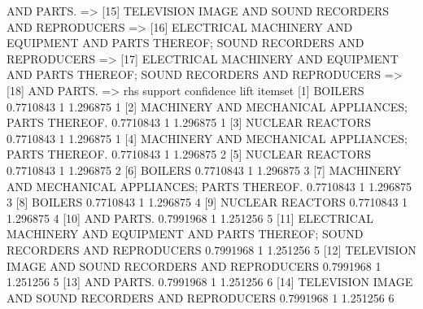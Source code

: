 \documentclass [a4paper] {article}
\begin{document}
{\begin{Schunk}
\begin{Soutput}
[14] {AND PARTS.}                                                                                                                                 =>
[15] {TELEVISION IMAGE AND SOUND RECORDERS AND REPRODUCERS}                                                                                       =>
[16] {ELECTRICAL MACHINERY AND EQUIPMENT AND PARTS THEREOF; SOUND RECORDERS AND REPRODUCERS}                                                      =>
[17] {ELECTRICAL MACHINERY AND EQUIPMENT AND PARTS THEREOF; SOUND RECORDERS AND REPRODUCERS}                                                      =>
[18] {AND PARTS.}                                                                                                                                 =>
     rhs                                                                                     support   confidence lift     itemset
[1]  {BOILERS}                                                                               0.7710843 1          1.296875 1      
[2]  {MACHINERY AND MECHANICAL APPLIANCES; PARTS THEREOF.}                                   0.7710843 1          1.296875 1      
[3]  {NUCLEAR REACTORS}                                                                      0.7710843 1          1.296875 1      
[4]  {MACHINERY AND MECHANICAL APPLIANCES; PARTS THEREOF.}                                   0.7710843 1          1.296875 2      
[5]  {NUCLEAR REACTORS}                                                                      0.7710843 1          1.296875 2      
[6]  {BOILERS}                                                                               0.7710843 1          1.296875 3      
[7]  {MACHINERY AND MECHANICAL APPLIANCES; PARTS THEREOF.}                                   0.7710843 1          1.296875 3      
[8]  {BOILERS}                                                                               0.7710843 1          1.296875 4      
[9]  {NUCLEAR REACTORS}                                                                      0.7710843 1          1.296875 4      
[10] {AND PARTS.}                                                                            0.7991968 1          1.251256 5      
[11] {ELECTRICAL MACHINERY AND EQUIPMENT AND PARTS THEREOF; SOUND RECORDERS AND REPRODUCERS} 0.7991968 1          1.251256 5      
[12] {TELEVISION IMAGE AND SOUND RECORDERS AND REPRODUCERS}                                  0.7991968 1          1.251256 5      
[13] {AND PARTS.}                                                                            0.7991968 1          1.251256 6      
[14] {TELEVISION IMAGE AND SOUND RECORDERS AND REPRODUCERS}                                  0.7991968 1          1.251256 6      

\end{Soutput}
\end{Schunk}}
\end{document}
